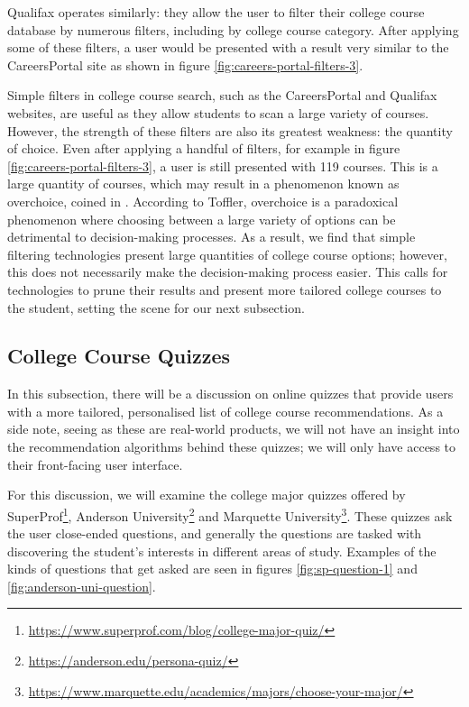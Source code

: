 Qualifax operates similarly: they allow the user to filter their college course database by numerous filters, including by college course category.
After applying some of these filters, a user would be presented with a result very similar to the CareersPortal site as shown in figure \ref{fig:careers-portal-filters-3}.

Simple filters in college course search, such as the CareersPortal and Qualifax websites, 
are useful as they allow students to scan a large variety of courses.
However, the strength of these filters are also its greatest weakness: the quantity of choice.
Even after applying a handful of filters, for example in figure \ref{fig:careers-portal-filters-3}, a user is still presented with 119 courses.
This is a large quantity of courses, which may result in a phenomenon known as overchoice, coined in \cite{toffler1970future}.
According to Toffler, overchoice is a paradoxical phenomenon where choosing between a large variety of options can be detrimental to decision-making processes.
As a result, we find that simple filtering technologies present large quantities of college course options;
however, this does not necessarily make the decision-making process easier.
This calls for technologies to prune their results and
present more tailored college courses to the student,
setting the scene for our next subsection.

\subsection{College Course Quizzes}

In this subsection, there will be a discussion on online quizzes that provide users with a more tailored, personalised list of college course recommendations.
As a side note, seeing as these are real-world products, we will not have an insight into the recommendation algorithms behind these quizzes;
we will only have access to their front-facing user interface.

For this discussion, we will examine the college major quizzes offered by SuperProf\footnote{\url{https://www.superprof.com/blog/college-major-quiz/}}, Anderson University\footnote{\url{https://anderson.edu/persona-quiz/}} and Marquette University\footnote{\url{https://www.marquette.edu/academics/majors/choose-your-major/}}.
These quizzes ask the user close-ended questions, and generally the questions are tasked with discovering the student's interests in different areas of study.
Examples of the kinds of questions that get asked are seen in figures \ref{fig:sp-question-1} and \ref{fig:anderson-uni-question}.

